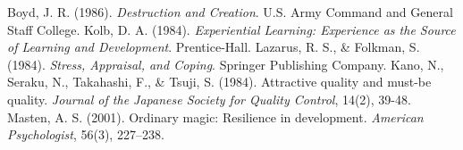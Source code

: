 \documentclass{article}
\begin{document}
\begin{thebibliography}{99}
     Boyd, J. R. (1986). \textit{Destruction and Creation}. U.S. Army Command and General Staff College.
     Kolb, D. A. (1984). \textit{Experiential Learning: Experience as the Source of Learning and Development}. Prentice-Hall.
     Lazarus, R. S., \& Folkman, S. (1984). \textit{Stress, Appraisal, and Coping}. Springer Publishing Company.
     Kano, N., Seraku, N., Takahashi, F., \& Tsuji, S. (1984). Attractive quality and must-be quality. \textit{Journal of the Japanese Society for Quality Control}, 14(2), 39-48.
     Masten, A. S. (2001). Ordinary magic: Resilience in development. \textit{American Psychologist}, 56(3), 227–238.
\end{thebibliography}
\end{document}
